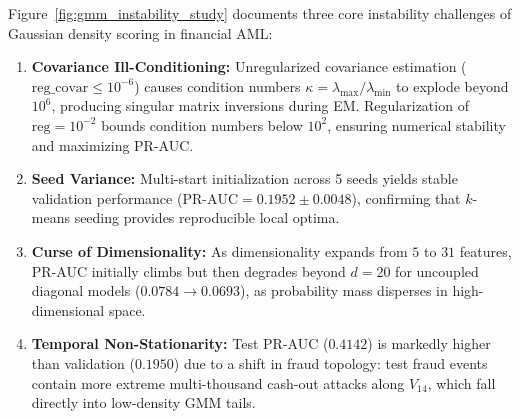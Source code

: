 Figure~\ref{fig:gmm_instability_study} documents three core instability challenges of Gaussian density scoring in financial AML:
\begin{enumerate}
    \item \textbf{Covariance Ill-Conditioning:} Unregularized covariance estimation ($\text{reg\_covar} \le 10^{-6}$) causes condition numbers $\kappa = \lambda_{\max}/\lambda_{\min}$ to explode beyond $10^6$, producing singular matrix inversions during EM. Regularization of $\text{reg}=10^{-2}$ bounds condition numbers below $10^2$, ensuring numerical stability and maximizing PR-AUC.
    \item \textbf{Seed Variance:} Multi-start initialization across 5 seeds yields stable validation performance ($\text{PR-AUC} = 0.1952 \pm 0.0048$), confirming that $k$-means seeding provides reproducible local optima.
    \item \textbf{Curse of Dimensionality:} As dimensionality expands from $5$ to $31$ features, PR-AUC initially climbs but then degrades beyond $d=20$ for uncoupled diagonal models ($0.0784 \to 0.0693$), as probability mass disperses in high-dimensional space.
    \item \textbf{Temporal Non-Stationarity:} Test PR-AUC ($0.4142$) is markedly higher than validation ($0.1950$) due to a shift in fraud topology: test fraud events contain more extreme multi-thousand cash-out attacks along $V_{14}$, which fall directly into low-density GMM tails.
\end{enumerate}
